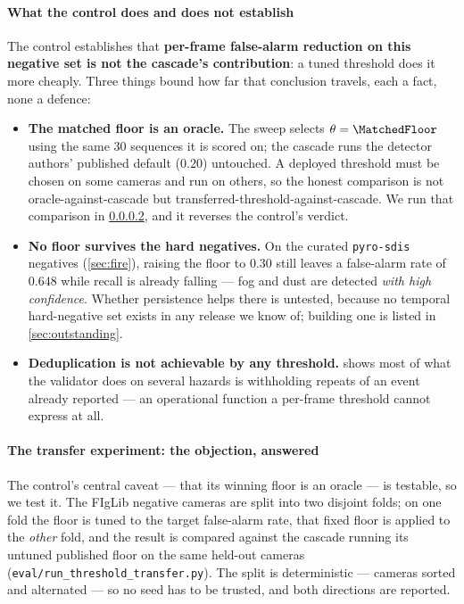 \paragraph{What the control does and does not establish}
\label{sec:scoped-claim}

The control establishes that \textbf{per-frame false-alarm reduction on this
negative set is not the cascade's contribution}: a tuned threshold does it
more cheaply. Three things bound how far that conclusion travels, each a
fact, none a defence:

\begin{itemize}
  \item \textbf{The matched floor is an oracle.} The sweep selects
        $\theta = \MatchedFloor$ using the same 30 sequences it is scored on;
        the cascade runs the detector authors' published default ($0.20$)
        untouched. A deployed threshold must be chosen on some cameras and run
        on others, so the honest comparison is not oracle-against-cascade but
        transferred-threshold-against-cascade. We run that comparison in
        \cref{sec:threshold-transfer-exp}, and it reverses the control's
        verdict.
  \item \textbf{No floor survives the hard negatives.} On the curated
        \texttt{pyro-sdis} negatives (\cref{sec:fire}), raising the floor to
        $0.30$ still leaves a false-alarm rate of $0.648$ while recall is
        already falling — fog and dust are detected \emph{with high
        confidence}. Whether persistence helps there is untested, because no
        temporal hard-negative set exists in any release we know of; building
        one is listed in \cref{sec:outstanding}.
  \item \textbf{Deduplication is not achievable by any threshold.}
         shows most of what the validator does on
        several hazards is withholding repeats of an event already reported —
        an operational function a per-frame threshold cannot express at all.
\end{itemize}

\paragraph{The transfer experiment: the objection, answered}
\label{sec:threshold-transfer-exp}

The control's central caveat — that its winning floor is an oracle — is
testable, so we test it. The \TransferCameras{} FIgLib negative cameras are
split into two disjoint folds; on one fold the floor is tuned to the target
false-alarm rate, that fixed floor is applied to the \emph{other} fold, and
the result is compared against the cascade running its untuned published
floor on the same held-out cameras (\texttt{eval/run\_threshold\_transfer.py}).
The split is deterministic — cameras sorted and alternated — so no seed has to
be trusted, and both directions are reported.

